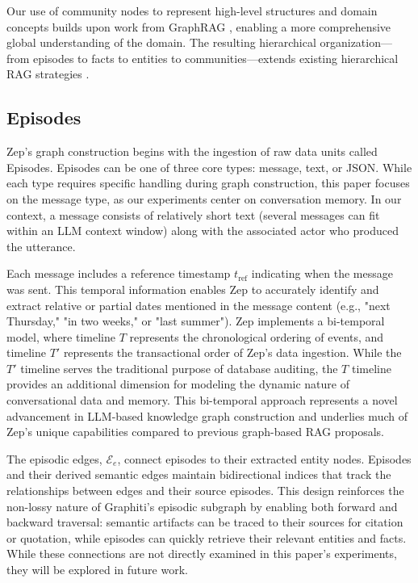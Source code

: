 \documentclass{article}
\begin{document}
Our use of community nodes to represent high-level structures and domain concepts builds upon work from GraphRAG \cite{graphrag}, enabling a more comprehensive global understanding of the domain. The resulting hierarchical organization—from episodes to facts to entities to communities—extends existing hierarchical RAG strategies \cite{chen2024hiqahierarchicalcontextualaugmentation}\cite{goel2024hirohierarchicalinformationretrieval}.

\subsection{Episodes}
Zep's graph construction begins with the ingestion of raw data units called Episodes. Episodes can be one of three core types: message, text, or JSON. While each type requires specific handling during graph construction, this paper focuses on the message type, as our experiments center on conversation memory. In our context, a message consists of relatively short text (several messages can fit within an LLM context window) along with the associated actor who produced the utterance.

Each message includes a reference timestamp $t_\text{ref}$ indicating when the message was sent. This temporal information enables Zep to accurately identify and extract relative or partial dates mentioned in the message content (e.g., "next Thursday," "in two weeks," or "last summer"). Zep implements a bi-temporal model, where timeline $T$ represents the chronological ordering of events, and timeline $T'$ represents the transactional order of Zep's data ingestion. While the $T'$ timeline serves the traditional purpose of database auditing, the $T$ timeline provides an additional dimension for modeling the dynamic nature of conversational data and memory. This bi-temporal approach represents a novel advancement in LLM-based knowledge graph construction and underlies much of Zep's unique capabilities compared to previous graph-based RAG proposals.

The episodic edges, $\mathcal{E}_e$, connect episodes to their extracted entity nodes. Episodes and their derived semantic edges maintain bidirectional indices that track the relationships between edges and their source episodes. This design reinforces the non-lossy nature of Graphiti's episodic subgraph by enabling both forward and backward traversal: semantic artifacts can be traced to their sources for citation or quotation, while episodes can quickly retrieve their relevant entities and facts. While these connections are not directly examined in this paper's experiments, they will be explored in future work.
\end{document}
